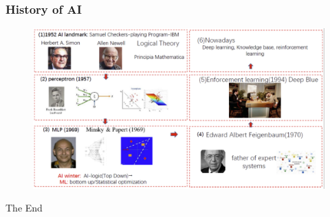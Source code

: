 \documentclass[9pt]{beamer}
\begin{document}
\begin{CJK*}{GBK}{kai}
\begin{frame}
\end{frame}

\begin{frame}
	\frametitle{History of AI}
	\begin{figure}[h]
		\centering
		\includegraphics[scale=0.35]{AIHistory.png}		
	\end{figure}
	
\end{frame}
\begin{frame}
\Huge{\centerline{The End}}
\end{frame}
\end{CJK*}
\end{document}
